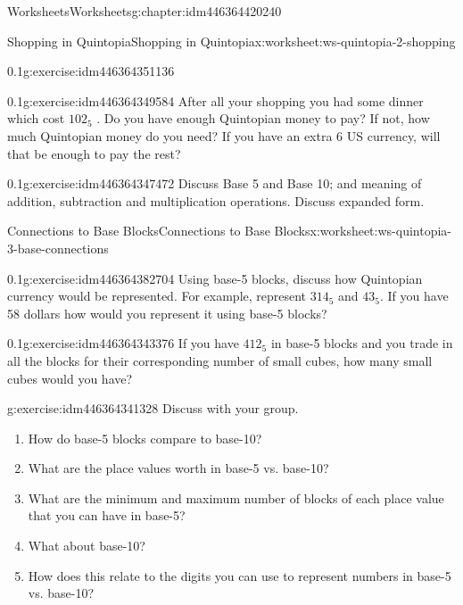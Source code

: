 \documentclass[twoside,11pt,]{book}
\begin{document}
\begin{chapterptx}{Worksheets}{}{Worksheets}{}{}{g:chapter:idm446364420240}
\begin{worksheet-section-numberless}{Shopping in Quintopia}{}{Shopping in Quintopia}{}{}{x:worksheet:ws-quintopia-2-shopping}
\begin{divisionexercise}{4}{}{0.1}{g:exercise:idm446364351136}
\end{divisionexercise}%
\begin{divisionexercise}{5}{}{0.1}{g:exercise:idm446364349584}%
After all your shopping you had some dinner which cost \(102_{5}\) . Do you have enough Quintopian money to pay? If not, how much Quintopian money do you need?  If you have an extra \textdollar{}6 US currency, will that be enough to pay the rest?%
\end{divisionexercise}%
\begin{divisionexercise}{6}{}{0.1}{g:exercise:idm446364347472}%
Discuss Base 5 and Base 10; and meaning of addition, subtraction and multiplication operations. Discuss expanded form.%
\end{divisionexercise}%
\end{worksheet-section-numberless}
\restoregeometry
%
%
\typeout{************************************************}
\typeout{************************************************}
%
\begin{worksheet-section-numberless}{Connections to Base Blocks}{}{Connections to Base Blocks}{}{}{x:worksheet:ws-quintopia-3-base-connections}
\begin{divisionexercise}{1}{}{0.1}{g:exercise:idm446364382704}%
Using base-5 blocks, discuss how Quintopian currency would be represented. For example, represent \(314_{5}\) and \(43_{5}\). If you have \textdollar{}58 dollars how would you represent it using base-5 blocks?%
\end{divisionexercise}%
\begin{divisionexercise}{2}{}{0.1}{g:exercise:idm446364343376}%
If you have \(412_{5}\) in base-5 blocks and you trade in all the blocks for their corresponding number of small cubes, how many small cubes would you have?%
\end{divisionexercise}%
\begin{divisionexercise}{3}{}{}{g:exercise:idm446364341328}%
Discuss with your group.%
%
\begin{enumerate}[label=(\alph*)]
\item{}How do base-5 blocks compare to base-10?%
\item{}What are the place values worth in base-5 vs. base-10?%
\item{}What are the minimum and maximum number of blocks of each place value that you can have in base-5?%
\item{}What about base-10?%
\item{}How does this relate to the digits you can use to represent numbers in base-5 vs. base-10?%

\end{enumerate}
\end{divisionexercise}
\end{worksheet-section-numberless}
\end{chapterptx}
\end{document}
